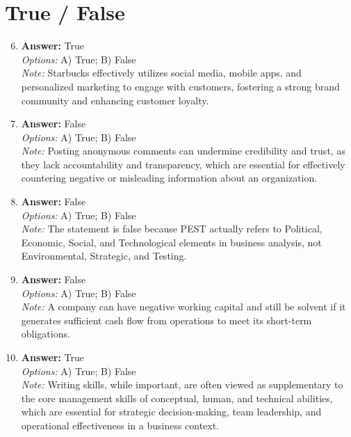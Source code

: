 \documentclass[12pt]{article}
\begin{document}
\section*{True / False}
\begin{enumerate}[label=\arabic*.]
\setcounter{enumi}{5}
\item \textbf{Answer:} True
\\ \textit{Options:} A) True; B) False
\\ \textit{Note:} Starbucks effectively utilizes social media, mobile apps, and personalized marketing to engage with customers, fostering a strong brand community and enhancing customer loyalty.
\item \textbf{Answer:} False
\\ \textit{Options:} A) True; B) False
\\ \textit{Note:} Posting anonymous comments can undermine credibility and trust, as they lack accountability and transparency, which are essential for effectively countering negative or misleading information about an organization.
\item \textbf{Answer:} False
\\ \textit{Options:} A) True; B) False
\\ \textit{Note:} The statement is false because PEST actually refers to Political, Economic, Social, and Technological elements in business analysis, not Environmental, Strategic, and Testing.
\item \textbf{Answer:} False
\\ \textit{Options:} A) True; B) False
\\ \textit{Note:} A company can have negative working capital and still be solvent if it generates sufficient cash flow from operations to meet its short-term obligations.
\item \textbf{Answer:} True
\\ \textit{Options:} A) True; B) False
\\ \textit{Note:} Writing skills, while important, are often viewed as supplementary to the core management skills of conceptual, human, and technical abilities, which are essential for strategic decision-making, team leadership, and operational effectiveness in a business context.
\end{enumerate}
\end{document}
